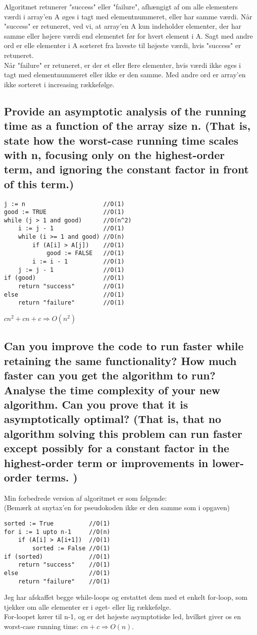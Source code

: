 \documentclass[a4paper,12pt]{article}
\begin{document}
Algoritmet retunerer "success" eller "failure", afhængigt af om alle elementers værdi i array'en A øges i tagt med elementnummeret, eller har samme værdi.
Når "success" er retuneret, ved vi, at array'en A kun indeholder elementer, der har samme eller højere værdi end elementet før for hvert element i A. Sagt med andre ord er elle elementer i A sorteret fra laveste til højeste værdi, hvis "success" er retuneret.\\
Når "failure" er retuneret, er der et eller flere elementer, hvis værdi ikke øges i tagt med elementnummeret eller ikke er den samme. Med andre ord er array'en ikke sorteret i increasing rækkefølge.
    
\subsection[]{Provide an asymptotic analysis of the running time as a function of the array size n. (That
is, state how the worst-case running time scales with n, focusing only on the highest-order
term, and ignoring the constant factor in front of this term.)}
    
\begin{lstlisting}
j := n                      //O(1)
good := TRUE                //O(1)
while (j > 1 and good)      //O(n^2)
    i := j - 1              //O(1)
    while (i >= 1 and good) //O(n)
        if (A[i] > A[j])    //O(1)
            good := FALSE   //O(1)
        i := i - 1          //O(1)
    j := j - 1              //O(1)
if (good)                   //O(1)
    return "success"        //O(1)
else                        //O(1)
    return "failure"        //O(1)
\end{lstlisting}
$cn^2 + cn + c \Rightarrow O(n^2)$

\subsection[]{Can you improve the code to run faster while retaining the same functionality? How
much faster can you get the algorithm to run? Analyse the time complexity of your new
algorithm. Can you prove that it is asymptotically optimal? (That is, that no algorithm
solving this problem can run faster except possibly for a constant factor in the highest-order
term or improvements in lower-order terms. )}

Min forbedrede version af algoritmet er som følgende:\\
(Bemærk at snytax'en for pseudokoden ikke er den samme som i opgaven)
\begin{lstlisting}
sorted := True          //O(1)
for i := 1 upto n-1     //O(n)
    if (A[i] > A[i+1])  //O(1)
        sorted := False //O(1)
if (sorted)             //O(1)
    return "success"    //O(1)
else                    //O(1)
    return "failure"    //O(1)
\end{lstlisting}
Jeg har afskaffet begge while-loops og erstattet dem med et enkelt for-loop, som tjekker om alle elementer er i øget- eller lig rækkefølge.\\
For-loopet kører til n-1, og er det højeste asymptotiske led, hvilket giver os en worst-case running time: $cn + c \Rightarrow O(n)$.
\end{document}

